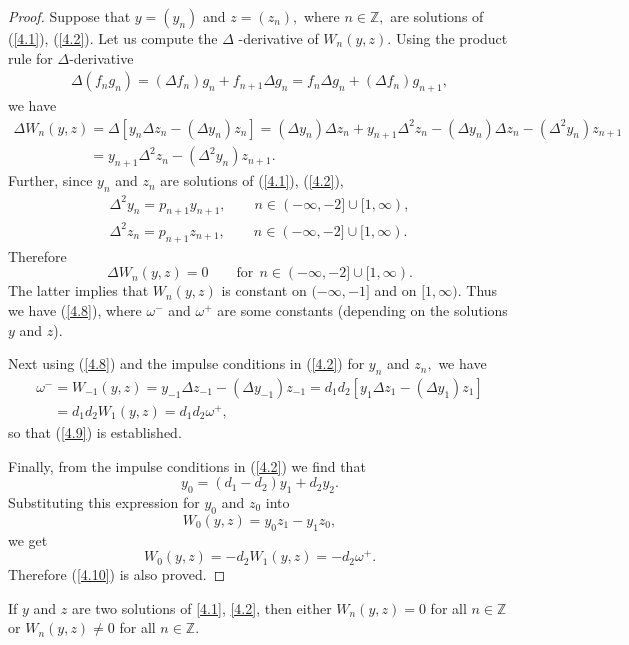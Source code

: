 \documentclass[pdftex]{sigma}
\numberwithin{equation}{section}
\begin{document}
\begin{proof}
Suppose that $y=(y_{n})$ and $z=(z_{n}),$ where $n\in
\mathbb{Z}
,$ are solutions of (\ref{4.1}), (\ref{4.2}). Let us compute the $\Delta $%
-derivative of $W_{n}(y,z)$. Using the product rule for $\Delta $-derivative%
\begin{gather*}
\Delta (f_{n}g_{n}) = (\Delta f_{n})g_{n}+f_{n+1}\Delta g_{n}
= f_{n}\Delta g_{n}+(\Delta f_{n})g_{n+1},
\end{gather*}
we have
\begin{gather*}
\Delta W_{n}(y,z)=\Delta \left[ y_{n}\Delta z_{n}-(\Delta y_{n})z_{n}\right]
=(\Delta y_{n})\Delta z_{n}+y_{n+1}\Delta ^{2}z_{n}-(\Delta y_{n})\Delta
z_{n}-(\Delta ^{2}y_{n})z_{n+1}
\\
\phantom{\Delta W_{n}(y,z)}{}
=y_{n+1}\Delta ^{2}z_{n}-(\Delta ^{2}y_{n})z_{n+1}.
\end{gather*}
Further, since $y_{n}$ and $z_{n}$ are solutions of (\ref{4.1}), (\ref{4.2}),%
\begin{gather*}
\Delta ^{2}y_{n}=p_{n+1}y_{n+1},\qquad n\in (-\infty ,-2]\cup \lbrack
1,\infty ),
\\
\Delta ^{2}z_{n}=p_{n+1}z_{n+1},\qquad n\in (-\infty ,-2]\cup \lbrack
1,\infty ).
\end{gather*}
Therefore%
\[
\Delta W_{n}(y,z)=0\qquad \text{for} \ \ n\in (-\infty ,-2]\cup \lbrack
1,\infty ).
\]%
The latter implies that $W_{n}(y,z)$ is constant on $(-\infty ,-1]$ and on $%
[1,\infty ).$ Thus we have (\ref{4.8}), where $\omega ^{-}$ and $\omega ^{+}$
are some constants (depending on the solutions $y$ and $z$).

Next using (\ref{4.8}) and the impulse conditions in (\ref{4.2}) for $y_{n}$
and $z_{n},$ we have{\samepage
\begin{gather*}
\omega ^{-}=W_{-1}(y,z)=y_{-1}\Delta z_{-1}-(\Delta y_{-1})z_{-1}
=d_{1}d_{2}[y_{1}\Delta z_{1}-(\Delta
y_{1})z_{1}]\\
\phantom{\omega ^{-}}{} =d_{1}d_{2}W_{1}(y,z)=d_{1}d_{2}\omega ^{+},
\end{gather*}
so that (\ref{4.9}) is established.}

Finally, from the impulse conditions in (\ref{4.2}) we f\/ind that%
\[
y_{0}=(d_{1}-d_{2})y_{1}+d_{2}y_{2}.
\]%
Substituting this expression for $y_{0}$ and $z_{0}$ into
\[
W_{0}(y,z)=y_{0}z_{1}-y_{1}z_{0},
\]%
we get%
\[
W_{0}(y,z)=-d_{2}W_{1}(y,z)=-d_{2}\omega ^{+}.
\]%
Therefore (\ref{4.10}) is also proved.
\end{proof}

\begin{corollary}
\label{Cor4.4}If $y$ and $z$ are two solutions of \eqref{4.1}, \eqref{4.2},
then either $W_{n}(y,z)=0$ for all $n\in
\mathbb{Z}$ or $W_{n}(y,z)\neq 0$ for all $n\in
\mathbb{Z}.$
\end{corollary}
\end{document}
